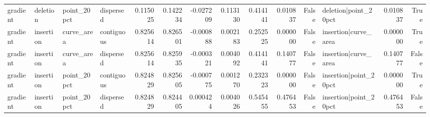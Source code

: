 \begin{table}
\begin{tabular}{llllrrrrrrrlrr}
gradient & deletion & point\_20pct & dispersed & 0.115025 & 0.142234 & -0.027209 & 0.113130 & 0.414141 & 0.010837 & False & deletion|point\_20pct & 0.010837 & True \\
gradient & insertion & curve\_area & contiguous & 0.825614 & 0.826501 & -0.000888 & 0.002183 & 0.252525 & 0.000000 & False & insertion|curve\_area & 0.000000 & True \\
gradient & insertion & curve\_area & dispersed & 0.825614 & 0.825935 & -0.000321 & 0.004092 & 0.414141 & 0.140777 & False & insertion|curve\_area & 0.140777 & False \\
gradient & insertion & point\_20pct & contiguous & 0.824829 & 0.825605 & -0.000775 & 0.001270 & 0.232323 & 0.000000 & False & insertion|point\_20pct & 0.000000 & True \\
gradient & insertion & point\_20pct & dispersed & 0.824829 & 0.824405 & 0.000424 & 0.004026 & 0.545455 & 0.476453 & False & insertion|point\_20pct & 0.476453 & False \\
\bottomrule
\end{tabular}
\end{table}
